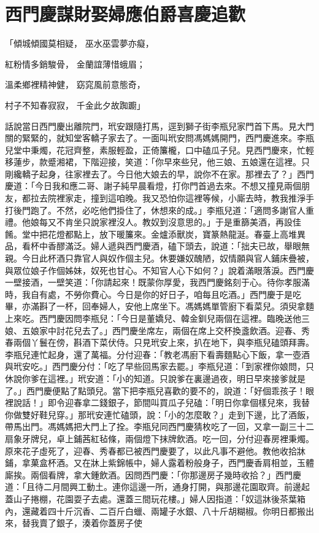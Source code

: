 %

\chapter{西門慶謀財娶婦\KG 應伯爵喜慶追歡}

「傾城傾國莫相疑，  巫水巫雲夢亦癡，

紅粉情多銷駿骨，  金蘭誼薄惜蛾眉；

溫柔鄉裡精神健，  窈窕風前意態奇，

村子不知春寂寂，  千金此夕故踟躕」

話說當日西門慶出離院門，玳安跟隨打馬，逕到獅子街李瓶兒家門首下馬。見大門關的緊緊的，就知堂客轎子家去了。一面叫玳安問馮媽媽開門，西門慶進來。李瓶兒堂中秉燭，花冠齊整，素服輕盈，正倚簾櫳，口中磕瓜子兒。見西門慶來，忙輕移蓮步，款蹙湘裙，下階迎接，笑道：「你早來些兒，他三娘、五娘還在這裡。只剛纔轎子起身，往家裡去了。今日他大娘去的早，說你不在家。那裡去了？」西門慶道：「今日我和應二哥、謝子純早晨看燈，打你門首過去來。不想又撞見兩個朋友，都拉去院裡家走，撞到這咱晚。我又恐怕你這裡等候，小廝去時，教我推淨手打後門跑了。不然，必吃他們掛住了，休想來的成。」李瓶兒道：「適問多謝官人重禮。他娘每又不肯坐只說家裡沒人。教奴到沒意思的。」于是重篩美酒，再設佳餚。堂中把花燈都點上，放下暖簾來。金爐添獸炭，寶篆熱龍涎。春臺上高堆異品，看杯中香醪滿泛。婦人遞與西門慶酒，磕下頭去，說道：「拙夫已故，舉眼無親。今日此杯酒只靠官人與奴作個主兒。休要嫌奴醜陋，奴情願與官人鋪床疊被，與眾位娘子作個姊妹，奴死也甘心。不知官人心下如何？」說着滿眼落淚。西門慶一壁接酒，一壁笑道：「你請起來！既蒙你厚愛，我西門慶銘刻于心。待你孝服滿時，我自有處，不勞你費心。今日是你的好日子，咱每且吃酒。」西門慶于是吃畢，亦滿斟了一杯，回奉婦人，安他上席坐下。馮媽媽單管廚下看菜兒。須臾拿麵上來吃。西門慶因問李瓶兒：「今日是董嬌兒、韓金釧兒兩個在這裡。臨晚送他三娘、五娘家中討花兒去了。」西門慶坐席左，兩個在席上交杯換盞飲酒。迎春、秀春兩個丫鬟在傍，斟酒下菜伏侍。只見玳安上來，扒在地下，與李瓶兒磕頭拜壽。李瓶兒連忙起身，還了萬福。分付迎春：「教老馮廚下看壽麵點心下飯，拿一壺酒與玳安吃。」西門慶分付：「吃了早些回馬家去罷。」李瓶兒道：「到家裡你娘問，只休說你爹在這裡。」玳安道：「小的知道。只說爹在裏邊過夜，明日早來接爹就是了。」西門慶便點了點頭兒。當下把李瓶兒喜歡的要不的，說道：「好個乖孩子！眼裡說話！」即令迎春拿二錢銀子，節間叫買瓜子兒磕：「明日你拿個樣兒來，我替你做雙好鞋兒穿。」那玳安連忙磕頭，說：「小的怎麼敢？」走到下邊，比了酒飯，帶馬出門。馮媽媽把大門上了拴。李瓶兒同西門慶猜枚吃了一回，又拿一副三十二扇象牙牌兒，卓上鋪茜紅毡條，兩個燈下抹牌飲酒。吃一回，分付迎春房裡秉燭。原來花子虛死了，迎春、秀春都已被西門慶要了，以此凡事不避他。教他收拾牀鋪，拿菓盒杯酒。又在牀上紫錦帳中，婦人露着粉般身子，西門慶香肩相並，玉體廝挨。兩個看牌，拿大鍾飲酒。因問西門慶：「你那邊房子幾時收拾？」西門慶道：「且待二月間興工動土。連你這邊一所，通身打開，與那邊花園取齊。前邊起蓋山子捲棚，花園耍子去處。還蓋三間玩花樓。」婦人因指道：「奴這牀後茶葉箱內，還藏着四十斤沉香、二百斤白蠟、兩罐子水銀、八十斤胡糊椒。你明日都搬出來，替我賣了銀子，湊着你蓋房子使